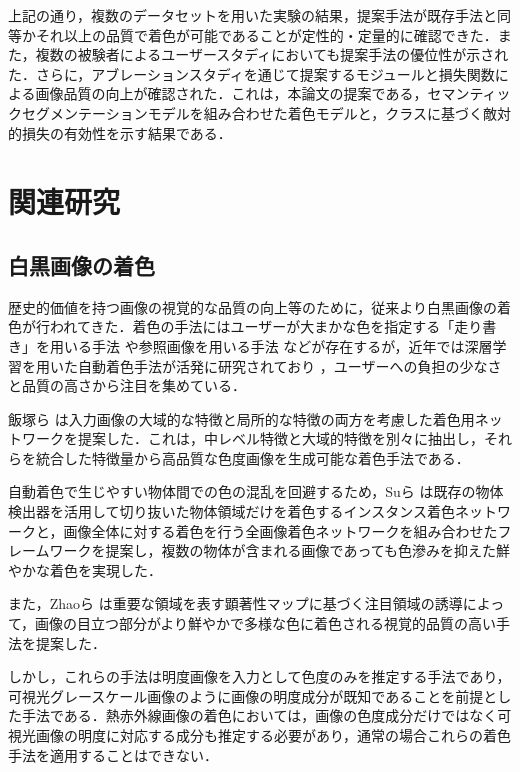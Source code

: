 \documentclass[11pt,dvipdfmx]{ujreport}
\begin{document}
上記の通り，複数のデータセットを用いた実験の結果，提案手法が既存手法と同等かそれ以上の品質で着色が可能であることが定性的・定量的に確認できた．また，複数の被験者によるユーザースタディにおいても提案手法の優位性が示された．さらに，アブレーションスタディを通じて提案するモジュールと損失関数による画像品質の向上が確認された．これは，本論文の提案である，セマンティックセグメンテーションモデルを組み合わせた着色モデルと，クラスに基づく敵対的損失の有効性を示す結果である．



\chapter{関連研究}

\label{chapter:related_work}
\section{白黒画像の着色}
\label{sec:grayscale_colorization}

歴史的価値を持つ画像の視覚的な品質の向上等のために，従来より白黒画像の着色が行われてきた．着色の手法にはユーザーが大まかな色を指定する「走り書き」を用いる手法 \cite{Sykora_2009-LazyBrush} や参照画像を用いる手法 \cite{Gupta_2012_SimilarImage} などが存在するが，近年では深層学習を用いた自動着色手法が活発に研究されており \cite{Iizuka_2016_SIGGRAPH, Su_2020_CVPR_Instance, Zhao_2021_IEEE_SCGAN, Cheng_2015_ICCV_DeepC, Zhao_2018_BMVC_PixellevelSG}，ユーザーへの負担の少なさと品質の高さから注目を集めている．\par
飯塚ら \cite{Iizuka_2016_SIGGRAPH}は入力画像の大域的な特徴と局所的な特徴の両方を考慮した着色用ネットワークを提案した．これは，中レベル特徴と大域的特徴を別々に抽出し，それらを統合した特徴量から高品質な色度画像を生成可能な着色手法である．\par
自動着色で生じやすい物体間での色の混乱を回避するため，Suら \cite{Su_2020_CVPR_Instance} は既存の物体検出器を活用して切り抜いた物体領域だけを着色するインスタンス着色ネットワークと，画像全体に対する着色を行う全画像着色ネットワークを組み合わせたフレームワークを提案し，複数の物体が含まれる画像であっても色滲みを抑えた鮮やかな着色を実現した．\par
また，Zhaoら \cite{Zhao_2021_IEEE_SCGAN} は重要な領域を表す顕著性マップに基づく注目領域の誘導によって，画像の目立つ部分がより鮮やかで多様な色に着色される視覚的品質の高い手法を提案した．
\par
しかし，これらの手法\cite{Iizuka_2016_SIGGRAPH, Su_2020_CVPR_Instance}は明度画像を入力として色度のみを推定する手法であり，可視光グレースケール画像のように画像の明度成分が既知であることを前提とした手法である．熱赤外線画像の着色においては，画像の色度成分だけではなく可視光画像の明度に対応する成分も推定する必要があり，通常の場合これらの着色手法を適用することはできない．
\end{document}
